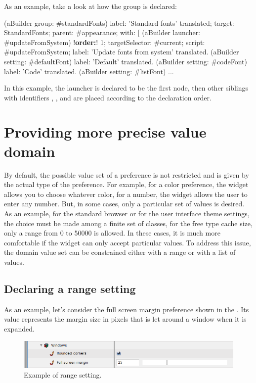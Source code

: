 \documentclass[a4paper,10pt,twoside]{book}
\begin{document}
As an example, take a look at how the  group is declared:
\begin{code}{}
(aBuilder group: #standardFonts)
	label: 'Standard fonts' translated;
	target: StandardFonts;
	parent: #appearance;
	with: [ 
		(aBuilder launcher: #updateFromSystem)
			!\textbf{order:}! 1; 
			targetSelector: #current;
			script: #updateFromSystem;
			label: 'Update fonts from system' translated.
		(aBuilder setting: #defaultFont)
			label: 'Default' translated.
		(aBuilder setting: #codeFont) 
			label: 'Code' translated.
		(aBuilder setting: #listFont)
     ...
\end{code}
In this example, the launcher  is declared to be the first node, then other siblings with identifiers , , and  are placed according to the declaration order.

\section{Providing more precise value domain}
By default, the possible value set of a preference is not restricted and is given by the actual type of the preference. For example, for a color preference, the widget allows you to choose whatever color, for a number, the widget allows the user to enter any number.
But, in some cases, only a particular set of values is desired. As an example, for the standard browser or for the user interface theme settings, the choice must be made among a finite set of classes, for the free type cache size, only a range from 0 to 50000 is allowed. In these cases, it is much more comfortable if the widget can only accept particular values. To address this issue, the domain value set can be constrained either with a range or with a list of values.

\subsection{Declaring a range setting}
As an example, let's consider the full screen margin preference shown in the . Its value represents the margin size in pixels that is let around a window when it is expanded. 

\begin{figure}[tbh]
\begin{center}
\includegraphics[scale=0.38]{fullScreenMargin}
\caption{Example of range setting.}
\end{center}
\end{figure}
\end{document}
